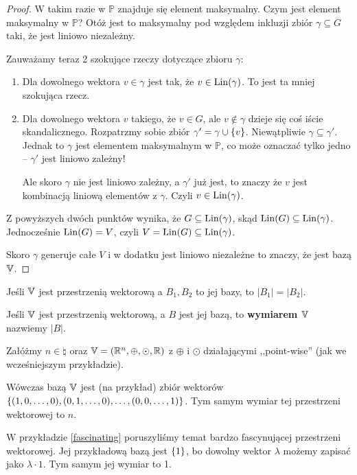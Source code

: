 \begin{proof}
    W takim razie w \(\mathbb{P}\) znajduje się element maksymalny. Czym jest element maksymalny w \(\mathbb{P}\)? Otóż jest to maksymalny pod względem inkluzji zbiór \(\gamma \subseteq G\) taki, że jest liniowo niezależny.
    
    Zauważamy teraz 2 szokujące rzeczy dotyczące zbioru \( \gamma \):
    
    \begin{enumerate}
        \item Dla dowolnego wektora \( v \in \gamma\) jest tak, że \( v \in {\mathrm{Lin}}(\gamma)\). To jest ta mniej szokująca rzecz.
        \item Dla dowolnego wektora \(v\) takiego, że \(v \in G\), ale \( v \not \in \gamma\) dzieje się coś iście skandalicznego. Rozpatrzmy sobie zbiór \( \gamma' = \gamma \cup \set {v} \). Niewątpliwie \(\gamma \subseteq \gamma'\). Jednak to \(\gamma\) jest elementem maksymalnym w \(\mathbb{P}\), co może oznaczać tylko jedno -- \(\gamma'\) jest liniowo zależny!
        
        Ale skoro \(\gamma\) nie jest liniowo zależny, a \(\gamma'\) już jest, to znaczy że \(v\) jest kombinacją liniową elementów z \(\gamma\). Czyli \( v \in {\mathrm{Lin}}(\gamma)\). 
    \end{enumerate}
    
    Z powyższych dwóch punktów wynika, że \(G \subseteq {\mathrm{Lin}}(\gamma)\), skąd \({\mathrm{Lin}}(G) \subseteq {\mathrm{Lin}}(\gamma)\). Jednocześnie \({\mathrm{Lin}}(G) = V\), czyli \(V = {\mathrm{Lin}}(G) \subseteq {\mathrm{Lin}}(\gamma)\). 
    
    Skoro \(\gamma\) generuje całe \(V\) i w dodatku jest liniowo niezależne to znaczy, że jest bazą \(\mathbb{V}\). 
\end{proof}

\begin{fact}
Jeśli \(\mathbb{V}\) jest przestrzenią wektorową a \(B_1, B_2\) to jej bazy, to \(|B_1| = |B_2|\).
\end{fact}

\begin{definition}
Jeśli \(\mathbb{V}\) jest przestrzenią wektorową, a \(B\) jest jej bazą, to \textbf{wymiarem \(\mathbb{V}\)} nazwiemy \(|B|\).
\end{definition}


\begin{example}
    Załóżmy \(n \in \natural\) oraz \(\mathbb{V} = (\mathbb{R}^{n}, \oplus, \odot, \mathbb{R})\) z \(\oplus\) i \(\odot\) działającymi ,,point-wise'' (jak we wcześniejszym przykładzie). 
    
    Wówczas bazą \(\mathbb{V}\) jest (na przykład) zbiór wektorów \(\set{(1, 0, \dots, 0), (0, 1, \dots, 0), \dots, (0, 0, \dots, 1)}\). Tym samym wymiar tej przestrzeni wektorowej to \(n\).
\end{example}

\begin{example}
   W przykładzie \ref{fascinating} poruszyliśmy temat bardzo fascynującej przestrzeni wektorowej. Jej przykładową bazą jest \(\set{1}\), bo dowolny wektor \(\lambda\) możemy zapisać jako \(\lambda \cdot 1\). Tym samym jej wymiar to 1.
\end{example}
